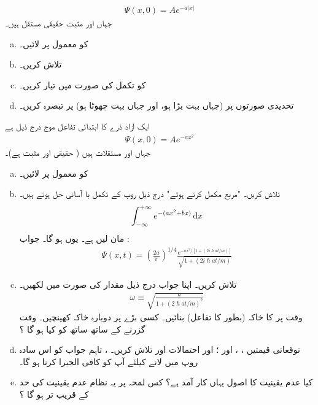 \begin{align*}
\Psi (x,0) = Ae^{ -a \left| x \right| } 
\end{align*}
جہاں  اور   مثبت حقیقی مستقل ہیں۔
\begin{enumerate}[a.]
\item 
{} کو معمول پر لائیں۔ 
\item
{} تلاش کریں۔ 
\item
{} کو تکمل کی صورت میں تیار کریں۔ 
\item
تحدیدی صورتوں پر (جہاں  بہت بڑا ہو، اور  جہاں   بہت چھوٹا ہو) پر تبصرہ کریں۔ 
\end{enumerate}
 \quad {}
 ایک آزاد ذرے کا ابتدائی تفاعل موج درج ذیل ہے
\begin{align*}
\Psi(x,0) = A e^{-ax^{2}}
\end{align*}
جہاں  اور  مستقلات ہیں ( حقیقی اور مثبت ہے)۔ 
\begin{enumerate}[a.]
\item
{} کو معمول پر لائیں۔ 
\item
{} تلاش کریں۔  "مربع مکمل کرتے ہوئے" درج ذیل روپ کے تکمل با آسانی حل ہوتے ہیں۔ 
\begin{align*}
\int_{-\infty}^{+\infty} e^{-(ax^{2} +bx)} \dif x
\end{align*}
مان لیں  ہے۔ یوں  ہو گا۔ جواب : 
\begin{align*}
\Psi(x,t) = \left( \frac{2a}{\pi} \right) ^{1/4} \frac{e^{-ax^{2}/[1+(2i\hslash at/m)]}}{\sqrt{1+(2i\hslash at/m)}}
\end{align*}
\item
{} تلاش کریں۔ اپنا جواب درج ذیل مقدار کی صورت میں لکھیں۔ 
\begin{align*}
\omega \equiv \sqrt{\frac{a}{1+(2\hslash at/m)^{2}}}
\end{align*}
وقت  پر  کا خاکہ  (بطور  کا تفاعل)  بنائیں۔ کسی بڑے  پر دوبارہ خاکہ کھینچیں۔ وقت  گزرنے کے ساتھ ساتھ   کو کیا ہو گا ؟
\item 
توقعاتی قیمتیں ، ،  اور ؛ اور احتمالات   اور   تلاش کریں۔
  ، تاہم  جواب کو  اس سادہ روپ میں لانے کیلئے آپ کو کافی الجبرا کرنا ہو گا۔ 
\item
کیا عدم یقینیت کا اصول یہاں کار آمد ہے؟ کس لمحہ  پر یہ نظام عدم یقینیت کی حد کے قریب تر ہو گا ؟
\end{enumerate}

